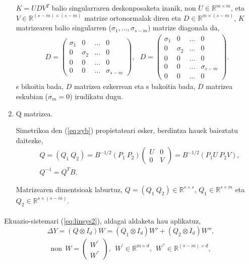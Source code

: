 \begin{enumerate}
$K=UDV^T$ balio singularraren deskonposaketa izanik, non $U \in \mathbb{R}^{m \times m}$, eta $V \in \mathbb{R}^{(s-m) \times (s-m)}$ matrize ortonormalak diren eta $D \in \mathbb{R}^{m \times (s-m)}$, $K$ matrizearen balio singularren ($\sigma_1, \dots, \sigma_{s-m}$) matrize diagonala da,
\begin{align}
\label{eq:Dmat}
D=
\left(
\begin{matrix}
\sigma_1 & 0 & \dots & 0 \\
0 & \sigma_2 & \dots & 0 \\
0 & 0 & \dots & 0 \\
0 & 0 & \dots & \sigma_{s-m}
\end{matrix}
\right), \ \ \
D=
\left(
\begin{matrix}
\sigma_1 & 0 & \dots & 0 \\
0 & \sigma_2 & \dots & 0 \\
0 & 0 & \dots & 0 \\
0 & 0 & \dots & \sigma_{s-m} \\
0 & 0 & \dots & 0
\end{matrix}
\right).
\end{align}
s bikoitia bada, $D$ matrizea ezkerrean eta s bakoitia bada, $D$ matrizea eskubian ($\sigma_m=0$) irudikatu dugu. 

\item Q matrizea.

Simetrikoa den (\ref{eq:syb}) propietateari esker, berdintza hauek baieztatu daitezke,
\begin{align}
&Q=(Q_1 \ Q_2)=
B^{-1/2}(P_1 \ P_2)
\left(
\begin{matrix}
U & 0 \\
0 & V
\end{matrix}
\right)=
B^{-1/2} (P_1U \ P_2V), \\
&Q^{-1}=Q^TB.
\end{align}  

Matrizearen dimentsioak laburtuz, $Q=(Q_1 \ Q_2) \in \mathbb{R}^{s \times s}$, $Q_1 \in \mathbb{R}^{s \times m}$ eta $Q_2 \in \mathbb{R}^{s \times (s-m)}$.

\end{enumerate}

\paragraph*{}Ekuazio-sistemari (\ref{eq:linsys2}), aldagai aldaketa hau aplikatuz,
\begin{equation}
\label{eq:DeltaYChVar}
 \Delta Y = (Q \otimes I_d) W= (Q_1 \otimes I_d) W'+ (Q_2 \otimes I_d) W'',
\end{equation}
\begin{align*}
\text{non}  \ \ W=\left(
\begin{matrix}
W^{'} \\
W^{''} 
\end{matrix}
\right),\ \ W^{'} \in \mathbb{R}^{m \times d}, \ \ W^{''} \in \mathbb{R}^{(s-m) \times d},
\end{align*}

